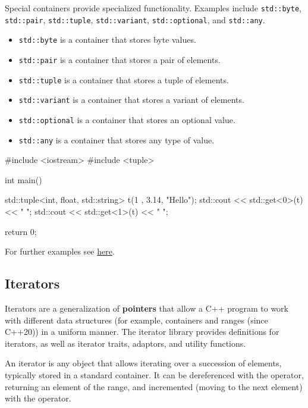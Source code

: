 Special containers provide specialized functionality. Examples include \texttt{std::byte}, \texttt{std::pair}, \texttt{std::tuple}, \texttt{std::variant}, \texttt{std::optional}, and \texttt{std::any}.
\begin{itemize}
    \item \texttt{std::byte} is a container that stores byte values.
    \item \texttt{std::pair} is a container that stores a pair of elements.
    \item \texttt{std::tuple} is a container that stores a tuple of elements.
    \item \texttt{std::variant} is a container that stores a variant of elements.
    \item \texttt{std::optional} is a container that stores an optional value.
    \item \texttt{std::any} is a container that stores any type of value.
\end{itemize}

\begin{exampleblock}
    \begin{codeblock}[language=C++]
#include <iostream>
#include <tuple>

int main() {
    std::tuple<int, float, std::string> t(1
    , 3.14, "Hello");
    std::cout << std::get<0>(t) << " ";
    std::cout << std::get<1>(t) << " ";

    return 0;
}
    \end{codeblock}
\end{exampleblock}

For further examples see \href{https://en.cppreference.com/w/cpp/container}{here}.


\subsection{Iterators}

Iterators are a generalization of \textbf{pointers} that allow a C++ program to work with different data
structures (for example, containers and ranges (since C++20)) in a uniform manner. The iterator
library provides definitions for iterators, as well as iterator traits, adaptors, and utility functions.

\begin{definitionblock}
    An iterator is any object that allows iterating over a succession of elements, typically stored in a
    standard container. It can be dereferenced with the \plaintt{*} operator, returning an element of the
    range, and incremented (moving to the next element) with the \plaintt{++} operator.
\end{definitionblock}

